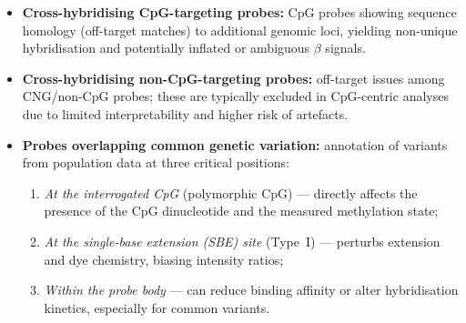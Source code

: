 \documentclass[10pt]{extarticle}
\begin{document}
\begin{itemize}[label=-]
  \item \textbf{Cross-hybridising CpG-targeting probes:} CpG probes showing sequence homology (off-target matches) to additional genomic loci, yielding non-unique hybridisation and potentially inflated or ambiguous $\beta$ signals.
  \item \textbf{Cross-hybridising non-CpG-targeting probes:} off-target issues among CNG/non-CpG probes; these are typically excluded in CpG-centric analyses due to limited interpretability and higher risk of artefacts.
  \item \textbf{Probes overlapping common genetic variation:} annotation of variants from population data at three critical positions:
  \begin{enumerate}[label=--]
    \item \textit{At the interrogated CpG} (polymorphic CpG) --- directly affects the presence of the CpG dinucleotide and the measured methylation state;
    \item \textit{At the single-base extension (SBE) site} (Type~I) --- perturbs extension and dye chemistry, biasing intensity ratios;
    \item \textit{Within the probe body} --- can reduce binding affinity or alter hybridisation kinetics, especially for common variants.
  \end{enumerate}
\end{itemize}
\end{document}
